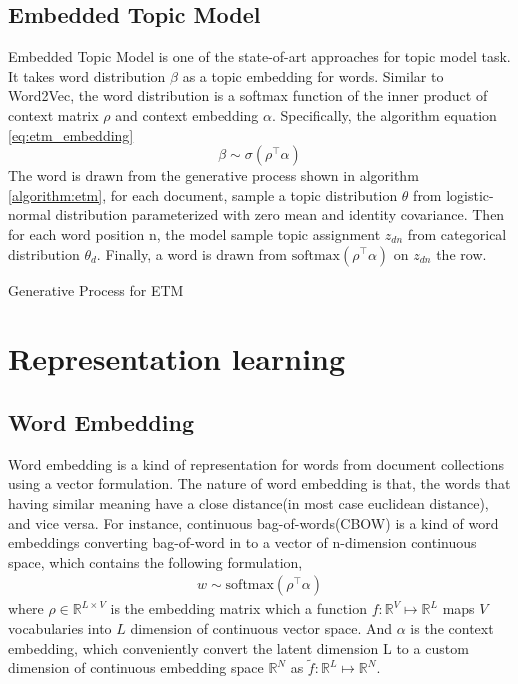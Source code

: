 \subsection{Embedded Topic Model} \label{ch2:etm}
Embedded Topic Model \cite{dieng_topic_2019} is one of the state-of-art approaches for topic model task. It takes word distribution $ \beta $ as a topic embedding for words. %
Similar to Word2Vec\cite{mikolov_distributed_nodate}, the word distribution is a softmax function of the inner product of context matrix $ \rho $ and context embedding $ \alpha $. Specifically, the algorithm   equation \ref{eq:etm_embedding}
\begin{equation}\label{eq:etm_embedding}
\beta\sim\sigma(\rho^\top\alpha)
\end{equation}
The word is drawn from the generative process shown in algorithm \ref{algorithm:etm}, for each document, sample a topic distribution $ \theta $ from logistic-normal distribution parameterized with zero mean and identity covariance. Then for each word position n, the model sample topic assignment $ z_{dn} $ from categorical distribution $ \theta_d $. Finally, a word is drawn from $ \text{softmax}(\rho^\top\alpha) $ on $ z_{dn} $ the row.\\
\begin{algorithm}[H]\label{algorithm:etm}
\caption{Generative Process for ETM}
\end{algorithm}
\section{Representation learning}
\subsection{Word Embedding} \label{ch2:we}
Word embedding\cite{bengio_neural_nodate} is a kind of representation for words from document collections using a vector formulation. The nature of word embedding is that, the words that having similar meaning have a close distance(in most case euclidean distance), and vice versa. For instance, continuous bag-of-words(CBOW) \cite{mikolov_distributed_nodate} is a kind of word embeddings converting bag-of-word in to a vector of n-dimension continuous space, which contains the following formulation,
\begin{align*}
w\sim\text{softmax}(\rho^\top\alpha)
\end{align*}
where $ \rho\in\mathbb{R}^{L\times V} $ is the embedding matrix which a function $ f:\mathbb{R}^V\mapsto\mathbb{R}^{L} $ maps $ V $ vocabularies into $ L $ dimension of continuous vector space. And $ \alpha $ is the context embedding, which conveniently convert the latent dimension L to a custom dimension of continuous embedding space $ \mathbb{R}^{N} $ as $ \tilde{f}:\mathbb{R}^L\mapsto\mathbb{R}^{N} $.
